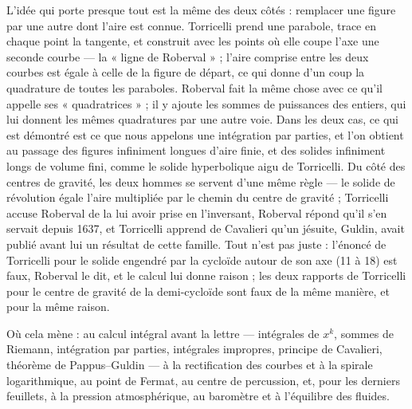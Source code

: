 \documentclass[11pt,a4paper]{article}
\begin{document}
\begin{resume}
L'idée qui porte presque tout est la même des deux côtés : remplacer une figure
par une autre dont l'aire est connue. Torricelli prend une parabole, trace en
chaque point la tangente, et construit avec les points où elle coupe l'axe une
seconde courbe — la « ligne de Roberval » ; l'aire comprise entre les deux courbes
est égale à celle de la figure de départ, ce qui donne d'un coup la quadrature de
toutes les paraboles. Roberval fait la même chose avec ce qu'il appelle ses
« quadratrices » ; il y ajoute les sommes de puissances des entiers, qui lui
donnent les mêmes quadratures par une autre voie. Dans les deux cas, ce qui est
démontré est ce que nous appelons une intégration par parties, et l'on obtient au
passage des figures infiniment longues d'aire finie, et des solides infiniment
longs de volume fini, comme le solide hyperbolique aigu de Torricelli. Du côté des centres de gravité, les deux hommes se servent d'une même
règle — le solide de révolution égale l'aire multipliée par le chemin du centre
de gravité ; Torricelli accuse Roberval de la lui avoir prise en l'inversant,
Roberval répond qu'il s'en servait depuis 1637, et Torricelli apprend de
Cavalieri qu'un jésuite, Guldin, avait publié avant lui un résultat de cette
famille. Tout n'est pas juste : l'énoncé de Torricelli pour le solide engendré par la cycloïde autour de son axe
(11 à 18) est faux, Roberval le dit, et le calcul lui donne raison ; les deux
rapports de Torricelli pour le centre de gravité de la demi-cycloïde sont faux de
la même manière, et pour la même raison.

Où cela mène : au calcul intégral avant la lettre — intégrales de $x^k$, sommes
de Riemann, intégration par parties, intégrales impropres, principe de
Cavalieri, théorème de Pappus–Guldin — à la rectification des courbes et à la
spirale logarithmique, au point de Fermat, au centre de percussion, et, pour les
derniers feuillets, à la pression atmosphérique, au baromètre et à l'équilibre
des fluides.

\end{resume}
\end{document}
